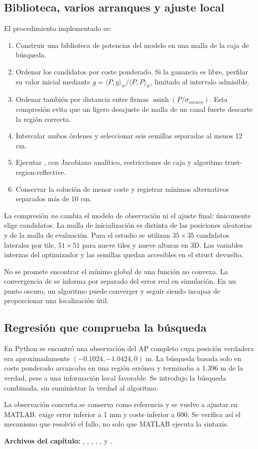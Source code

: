 \subsection{Biblioteca, varios arranques y ajuste local}
El procedimiento implementado es:
\begin{enumerate}
\item Construir una biblioteca de potencias del modelo en una malla de la caja de búsqueda.
\item Ordenar los candidatos por coste ponderado. Si la ganancia es libre, perfilar su valor inicial mediante $g=\langle P,y\rangle_w/\langle P,P\rangle_w$, limitado al intervalo admisible.
\item Ordenar también por distancia entre firmas $\operatorname{asinh}(P/\sigma_{oscuro})$. Esta compresión evita que un ligero desajuste de malla de un canal fuerte descarte la región correcta.
\item Intercalar ambos órdenes y seleccionar seis semillas separadas al menos 12 cm.
\item Ejecutar , con Jacobiano analítico, restricciones de caja y algoritmo trust-region-reflective.
\item Conservar la solución de menor coste y registrar mínimos alternativos separados más de 10 cm.
\end{enumerate}
La compresión \emph{no} cambia el modelo de observación ni el ajuste final: únicamente elige candidatos. La malla de inicialización es distinta de las posiciones aleatorias y de la malla de evaluación. Para el estudio se utilizan $35\times35$ candidatos laterales por tile, $51\times51$ para nueve tiles y nueve alturas en 3D. Las variables internas del optimizador y las semillas quedan accesibles en el struct devuelto.

No se promete encontrar el mínimo global de una función no convexa. La convergencia de  se informa por separado del error real en simulación. En un punto oscuro, un algoritmo puede converger y seguir siendo incapaz de proporcionar una localización útil.

\subsection{Regresión que comprueba la búsqueda}
En Python se encontró una observación del AP completo cuya posición verdadera era aproximadamente $(-0.1024,-1.0424,0)$ m. La búsqueda basada solo en coste ponderado arrancaba en una región errónea y terminaba a 1.396 m de la verdad, pese a una información local favorable. Se introdujo la búsqueda combinada, sin suministrar la verdad al algoritmo.

La observación concreta se conserva como referencia y se vuelve a ajustar en MATLAB.  exige error inferior a 1 mm y coste inferior a 600. Se verifica así el mecanismo que resolvió el fallo, no solo que MATLAB ejecuta la sintaxis.

\textbf{Archivos del capítulo:} , , , , ,  y .
